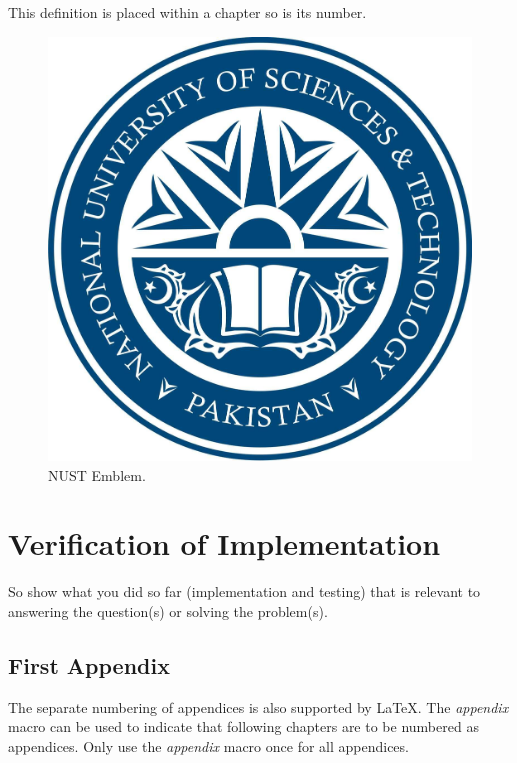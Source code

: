 \documentclass[11pt,a4paper,oneside]{book} %
\numberwithin{equation}{section}
\begin{document}
\begin{definition}[Testing 1,2,3]
This definition is placed within a chapter so is its number.
\end{definition}

\begin{figure}[http]
\begin{center}
  \includegraphics[width=0.7\columnwidth]{nust.jpg}
  \caption{NUST Emblem.}
  \label{f-nust}
\end{center}
\end{figure}


\chapter{Verification of Implementation}
\label{c-results}

So show what you did so far (implementation and testing) that is relevant to
answering the question(s) or solving the problem(s).


%


% 
%
\printbibliography


%
\begin{appendix}
\chapter{First Appendix}
The separate numbering of appendices is also supported by LaTeX. The \textit{appendix} macro can be used to indicate that following chapters are to be numbered as appendices. Only use the \textit{appendix} macro once for all appendices.
\end{appendix}



\end{document}
